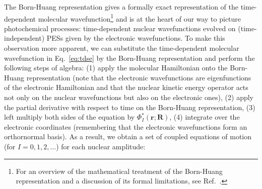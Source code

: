 \documentclass[9pt,bestpractices,pubversion]{livecoms}
\begin{document}
The Born-Huang representation gives a formally exact representation of the time-dependent molecular wavefunction\footnote{For an overview of the mathematical treatment of the Born-Huang representation and a discussion of its formal limitations, see Ref.~.} and is at the heart of our way to picture photochemical processes: time-dependent nuclear wavefunctions evolved on (time-independent) PESs given by the electronic wavefunctions. To make this observation more apparent, we can substitute the time-dependent molecular wavefunction in Eq.~\eqref{eq:tdse} by the Born-Huang representation and perform the following steps of algebra: (1) apply the molecular Hamiltonian onto the Born-Huang representation (note that the electronic wavefunctions are eigenfunctions of the electronic Hamiltonian and that the nuclear kinetic energy operator acts not only on the nuclear wavefunctions but also on the electronic ones), (2) apply the partial derivative with respect to time on the Born-Huang representation, (3) left multiply both sides of the equation by $\Phi_I^\ast(\mathbf{r};\mathbf{R})$, (4) integrate over the electronic coordinates (remembering that the electronic wavefunctions form an orthornormal basis). As a result, we obtain a set of coupled equations of motion (for $I=0, 1, 2, \dots$) for each nuclear amplitude:
\end{document}
